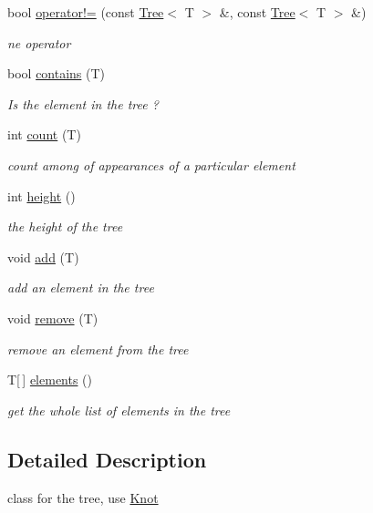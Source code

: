 \begin{DoxyCompactItemize}
bool \hyperlink{class_tree_ad9b3fd4767ddc1010e37e12353904195}{operator!=} (const \hyperlink{class_tree}{\-Tree}$<$ \-T $>$ \&, const \hyperlink{class_tree}{\-Tree}$<$ \-T $>$ \&)
\begin{DoxyCompactList}\small\item\em ne operator \end{DoxyCompactList}\item 
bool \hyperlink{class_tree_a82e827d8af5a3359fcf7a301ec60dda2}{contains} (\-T)
\begin{DoxyCompactList}\small\item\em \-Is the element in the tree ? \end{DoxyCompactList}\item 
int \hyperlink{class_tree_a10b806a5e1bd73f0533c8359c828bfe5}{count} (\-T)
\begin{DoxyCompactList}\small\item\em count among of appearances of a particular element \end{DoxyCompactList}\item 
int \hyperlink{class_tree_a70ffa62a683750147c7e0243c4a15c0c}{height} ()
\begin{DoxyCompactList}\small\item\em the height of the tree \end{DoxyCompactList}\item 
void \hyperlink{class_tree_a1c70114e580bdb15fd4fb8a951edd58b}{add} (\-T)
\begin{DoxyCompactList}\small\item\em add an element in the tree \end{DoxyCompactList}\item 
void \hyperlink{class_tree_a715e07e21bb3da46c21e67abd529867c}{remove} (\-T)
\begin{DoxyCompactList}\small\item\em remove an element from the tree \end{DoxyCompactList}\item 
\-T\mbox{[}$\,$\mbox{]} \hyperlink{class_tree_ab6844d5e6d1ed48ff3c7c205a8a5b16b}{elements} ()
\begin{DoxyCompactList}\small\item\em get the whole list of elements in the tree \end{DoxyCompactList}\end{DoxyCompactItemize}


\subsection{\-Detailed \-Description}
class for the tree, use \hyperlink{class_knot}{\-Knot} 

